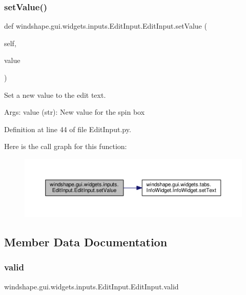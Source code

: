 \subsubsection{\texorpdfstring{set\+Value()}{setValue()}}
{\footnotesize\ttfamily def windshape.\+gui.\+widgets.\+inputs.\+Edit\+Input.\+Edit\+Input.\+set\+Value (\begin{DoxyParamCaption}\item[{}]{self,  }\item[{}]{value }\end{DoxyParamCaption})}

\begin{DoxyVerb}Set a new value to the edit text.

Args:
    value (str): New value for the spin box
\end{DoxyVerb}
 

Definition at line 44 of file Edit\+Input.\+py.

Here is the call graph for this function\+:\nopagebreak
\begin{figure}[H]
\begin{center}
\leavevmode
\includegraphics[width=350pt]{classwindshape_1_1gui_1_1widgets_1_1inputs_1_1_edit_input_1_1_edit_input_aeb95521b6141384bd655a9be996284bb_cgraph}
\end{center}
\end{figure}


\subsection{Member Data Documentation}
\mbox{\label{classwindshape_1_1gui_1_1widgets_1_1inputs_1_1_edit_input_1_1_edit_input_a6c8c431aa40800008cdd865bf17c711e}} 
\subsubsection{\texorpdfstring{valid}{valid}}
{\footnotesize\ttfamily windshape.\+gui.\+widgets.\+inputs.\+Edit\+Input.\+Edit\+Input.\+valid}



